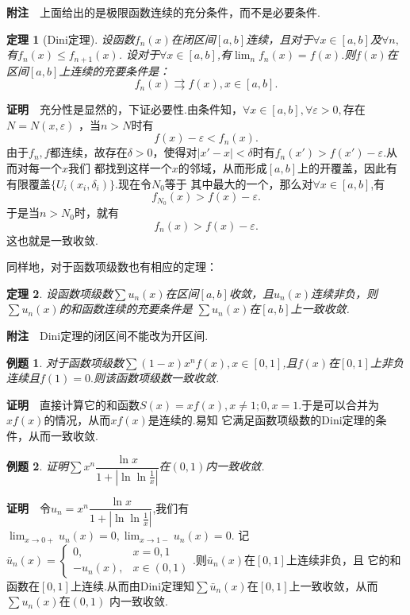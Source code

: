 \documentclass[UTF8]{article}
\newcommand{\zm}{\textbf{证明}$\quad$}
\newcommand{\fz}{\textbf{附注}$\quad$}
\newtheorem{thm}{\hspace{2em}定理}[section]
\newtheorem{exa}{\hspace{2em}例题}[section]
\begin{document}
\fz 上面给出的是极限函数连续的充分条件，而不是必要条件.
\begin{thm}[Dini定理]
  设函数$f_n(x)$在闭区间$[a,b]$连续，且对于$\forall x\in[a,b]$及$\forall n,$有$f_n(x)\le f_{n+1}(x)$.
  设对于$\forall x\in[a,b]$,有$\lim_nf_n(x)=f(x)$.则$f(x)$在区间$[a,b]$上连续的充要条件是：
  $$f_n(x)\rightrightarrows f(x),x\in[a,b].$$
\end{thm}
\zm 充分性是显然的，下证必要性.由条件知，$\forall x\in[a,b],\forall \varepsilon>0,$存在$N=N(x,\varepsilon)$
，当$n>N$时有$$f(x)-\varepsilon<f_n(x).$$
由于$f_n,f$都连续，故存在$\delta>0$，使得对$|x'-x|<\delta$时有$f_n(x')>f(x')-\varepsilon.$从而对每一个$x$我们
都找到这样一个$x$的邻域，从而形成$[a,b]$上的开覆盖，因此有有限覆盖$\{U_i(x_i,\delta_i)\}$.现在令$N_0$等于
其中最大的一个，那么对$\forall x\in[a,b]$,有
$$f_{N_0}(x)>f(x)-\varepsilon.$$
于是当$n>N_0$时，就有$$f_n(x)>f(x)-\varepsilon.$$
这也就是一致收敛.

同样地，对于函数项级数也有相应的定理：
\begin{thm}
  设函数项级数$\sum u_n(x)$在区间$[a,b]$收敛，且$u_n(x)$连续非负，则$\sum u_n(x)$的和函数连续的充要条件是
  $\sum u_n(x)$在$[a,b]$上一致收敛.
\end{thm}
\fz Dini定理的闭区间不能改为开区间.
\begin{exa}
  对于函数项级数$\sum (1-x)x^nf(x),x\in[0,1]$,且$f(x)$在$[0,1]$上非负连续且$f(1)=0.$则该函数项级数一致收敛.
\end{exa}
\zm 直接计算它的和函数$S(x)=xf(x),x\ne 1;0,x=1.$于是可以合并为$xf(x)$的情况，从而$xf(x)$是连续的.易知
它满足函数项级数的Dini定理的条件，从而一致收敛.
\begin{exa}
  证明$\sum x^n\dfrac{\ln x}{1+|\ln\ln\frac{1}{x}|}$在$(0,1)$内一致收敛.
\end{exa}
\zm 令$u_n=x^n\dfrac{\ln x}{1+|\ln\ln\frac{1}{x}|}$,我们有$\lim_{x\to0+}u_n(x)=0,\lim_{x\to1-}u_n(x)=0.$
记$\bar{u}_n(x)=\begin{cases}0,&x=0,1\\-u_n(x),&x\in(0,1)\end{cases}.$则$\bar{u}_n(x)$在$[0,1]$上连续非负，且
它的和函数在$[0,1]$上连续.从而由Dini定理知$\sum \bar{u}_n(x)$在$[0,1]$上一致收敛，从而$\sum u_n(x)$在$(0,1)$
内一致收敛.
\end{document}
